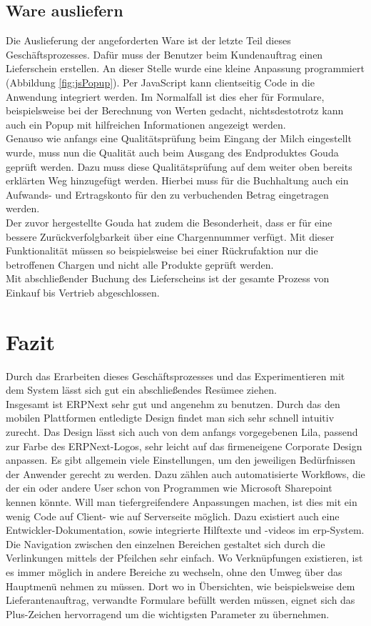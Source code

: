\subsection{Ware ausliefern}
Die Auslieferung der angeforderten Ware ist der letzte Teil dieses Geschäftsprozesses. Dafür muss der Benutzer beim Kundenauftrag einen Lieferschein erstellen. An dieser Stelle wurde eine kleine Anpassung programmiert (\vgl Abbildung \ref{fig:jsPopup}). Per JavaScript kann clientseitig Code in die Anwendung integriert werden. Im Normalfall ist dies eher für Formulare, beispielsweise bei der Berechnung von Werten gedacht, nichtsdestotrotz kann auch ein Popup mit hilfreichen Informationen angezeigt werden. \\
Genauso wie anfangs eine Qualitätsprüfung beim Eingang der Milch eingestellt wurde, muss nun die Qualität auch beim Ausgang des Endproduktes Gouda geprüft werden. Dazu muss diese Qualitätsprüfung auf dem weiter oben bereits erklärten Weg hinzugefügt werden. Hierbei muss für die Buchhaltung auch ein Aufwands- und Ertragskonto für den zu verbuchenden Betrag eingetragen werden. \\
Der zuvor hergestellte Gouda hat zudem die Besonderheit, dass er für eine bessere Zurückverfolgbarkeit über eine Chargennummer verfügt. Mit dieser Funktionalität müssen so beispielsweise bei einer Rückrufaktion nur die betroffenen Chargen und nicht alle Produkte geprüft werden. \\
Mit abschließender Buchung des Lieferscheins ist der gesamte Prozess von Einkauf bis Vertrieb abgeschlossen.

\section{Fazit}
Durch das Erarbeiten dieses Geschäftsprozesses und das Experimentieren mit dem System lässt sich gut ein abschließendes Resümee ziehen. \\
Insgesamt ist ERPNext sehr gut und angenehm zu benutzen. Durch das den mobilen Plattformen entledigte Design findet man sich sehr schnell intuitiv zurecht. Das Design lässt sich auch von dem anfangs vorgegebenen Lila, passend zur Farbe des ERPNext-Logos, sehr leicht auf das firmeneigene Corporate Design anpassen. Es gibt allgemein viele Einstellungen, um den jeweiligen Bedürfnissen der Anwender gerecht zu werden. Dazu zählen auch automatisierte Workflows, die der ein oder andere User schon von Programmen wie Microsoft Sharepoint kennen könnte. Will man tiefergreifendere Anpassungen machen, ist dies mit ein wenig Code auf Client- wie auf Serverseite möglich. Dazu existiert auch eine Entwickler-Dokumentation, sowie integrierte Hilftexte und -videos im \gls{erp}-System. \\
Die Navigation zwischen den einzelnen Bereichen gestaltet sich durch die Verlinkungen mittels der Pfeilchen sehr einfach. Wo Verknüpfungen existieren, ist es immer möglich in andere Bereiche zu wechseln, ohne den Umweg über das Hauptmenü nehmen zu müssen. Dort wo in Übersichten, wie beispielsweise dem Lieferantenauftrag, verwandte Formulare befüllt werden müssen, eignet sich das Plus-Zeichen hervorragend um die wichtigsten Parameter zu übernehmen.

